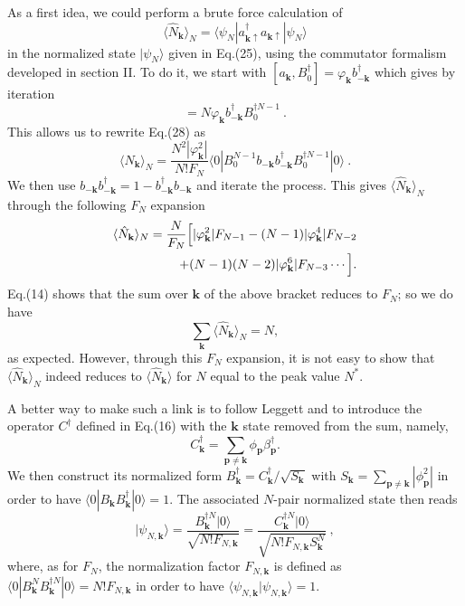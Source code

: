 \documentclass[twocolumn,showpacs]{revtex4}
\def\v#1{\mathbf{#1}}
\begin{document}
As a first idea, we could perform a brute force calculation of
\begin{equation}
 \langle\hat{N}_{\v{k}}\rangle_{N}=\langle\psi_N|a_{\v k\uparrow}^\dag a_{\v k\uparrow}|\psi_N\rangle
\end{equation}
in the normalized state $|\psi_N\rangle$ given in Eq.(25), using the commutator formalism developed in section II. To do it, we start with $[a_{\v k},B_0^\dag]=\varphi_{\v k}b_{-\v k}^\dag$ which gives by iteration
\begin{equation}
[a_{\v k},B_0^{\dag N}]=N\varphi_{\v k} b_{-\v k}^\dag B_0^{\dag N-1}\ .
\end{equation}
This allows us to rewrite Eq.(28) as
\begin{equation}
 \langle\hat{N}_{\v{k}}\rangle_{N}=\frac{N^2|\varphi_{\v k}^2|}{N!F_N}\langle 0|B_0^{N-1}b_{-\v k}b_{-\v k}^\dag B_0^{\dag N-1}|0\rangle\ .
\end{equation}
We then use $b_{-\v k}b_{-\v k}^\dag=1-b_{-\v k}^\dag b_{-\v k}$ and iterate the process. This gives $ \langle\hat{N}_{\v{k}}\rangle_{N}$ through the following $F_N$ expansion
\begin{eqnarray}
 \langle\hat{N}_{\v{k}}\rangle_{N}=\frac{N}{F_N}\Big{[}|\varphi_{\v k}^2|F_{N-1}-(N-1)|\varphi_{\v k}^4|F_{N-2}
\nonumber\\
+(N-1)(N-2)|\varphi_{\v k}^6|F_{N-3}\cdots\Big{]}.
\end{eqnarray}
Eq.(14) shows that the sum over $\v k$ of the above bracket reduces to $F_N$; so we do have
\begin{equation}
\sum_{\v k} \langle\hat{N}_{\v{k}}\rangle_{N}=N,
\end{equation}
 as expected. However, through this $F_N$ expansion, it is not easy to show that $ \langle\hat{N}_{\v{k}}\rangle_{N}$ indeed reduces to $ \langle\hat{N}_{\v{k}}\rangle$ for $N$ equal to the peak value $N^\ast$.

A better way to make such a link is to follow Leggett \cite{Leggett} and to introduce the operator $C^\dag$ defined in Eq.(16) with the $\v k$ state removed from the sum, namely,
\begin{equation}
C_{\v k}^\dag=\sum_{\v p\neq\v k}\phi_{\v p}\beta_{\v p}^\dag.
\end{equation}
We then construct its normalized form $B_{\v k}^\dag=C_{\v k}^\dag/\sqrt{S_{\v k}}$ with $S_{\v k}=\sum_{\v p\neq\v k}|\phi_{\v p}^2|$ in order to have $\langle 0|B_{\v k}B_{\v k}^\dag|0\rangle=1$. The associated $N$-pair normalized state then reads
\begin{equation}
|\psi_{N,\v k}\rangle=\frac{B_{\v k}^{\dag N}|0\rangle}{\sqrt{N!F_{N,\v k}}}=
\frac{C_{\v k}^{\dag N}|0\rangle}{\sqrt{N!F_{N,\v k}S_{\v k}^N}}\ ,
\end{equation}
where, as for $F_N$, the normalization factor $F_{N,\v k}$ is defined as $\langle 0|B_{\v k}^NB_{\v k}^{\dag N}|0\rangle=N!F_{N,\v k}$ in order to have $\langle\psi_{N,\v k}|\psi_{N,\v k}\rangle=1$.
\end{document}
